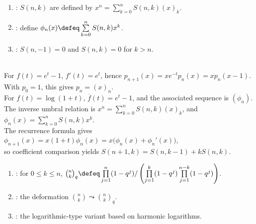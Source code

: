 \begin{definition} \label{def:stirling-and-exponential-polynomials} 
\begin{enumerate}[label=(\roman*)]
\setlength{\itemsep}{0pt}
\item {}: $S(n,k)$ are defined by $x^n=\sum\limits_{k=0}^{n}S(n,k)(x)_k$.
\item {}: define $\phi_n(x)\defeq\sum\limits_{k=0}^{n}S(n,k)x^k$.
\item {}: $S(n,-1)=0$ and $S(n,k)=0$ for $k>n$.
\end{enumerate}
\end{definition}

\begin{example} \label{ex:umbral-recurrences-stirling} \\
For $f(t)=e^t-1$, $f'(t)=e^t$, hence $p_{n+1}(x)=xe^{-t}p_n(x)=xp_n(x-1)$. With $p_0=1$, this gives $p_n=(x)_n$.\\
For $f(t)=\log(1+t)$, $\overline f(t)=e^t-1$, and the associated sequence is $(\phi_n)$.\\
The inverse umbral relation is $x^n=\sum\limits_{k=0}^{n}S(n,k)(x)_k$, and $\phi_n(x)=\sum\limits_{k=0}^{n}S(n,k)x^k$.\\
The recurrence formula gives $\phi_{n+1}(x)=x(1+t)\phi_n(x)=x\bigl(\phi_n(x)+\phi_n'(x)\bigr)$,\\
so coefficient comparison yields $S(n+1,k)=S(n,k-1)+kS(n,k)$.
\end{example}

\begin{definition} \label{def:q-and-logarithmic-umbral-variants} 
\begin{enumerate}[label=(\roman*)]
\setlength{\itemsep}{0pt}
\item {}: for $0\leq k\leq n$,
$\binom{n}{k}_q\defeq
\prod\limits_{j=1}^{n}(1-q^j)/
\left(\prod\limits_{j=1}^{k}(1-q^j)
\prod\limits_{j=1}^{n-k}(1-q^j)\right)$.
\item {}: the deformation $\binom{n}{k}\leadsto\binom{n}{k}_q$.
\item {}: the logarithmic-type variant based on harmonic logarithms.
\end{enumerate}
\end{definition}

